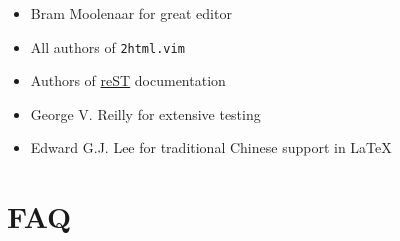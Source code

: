 \documentclass[12pt]{article}
\begin{document}
\begin{itemize}
\item
Bram Moolenaar for great editor

\item
All authors of \texttt{2html.vim}

\item
Authors of \href{http://docutils.sf.net}{reST} documentation

\item
George V. Reilly for extensive testing

\item
Edward G.J. Lee for traditional Chinese support in \LaTeX{}
\end{itemize}
\hypertarget{lfaq}{}
\section{FAQ}
\end{document}
